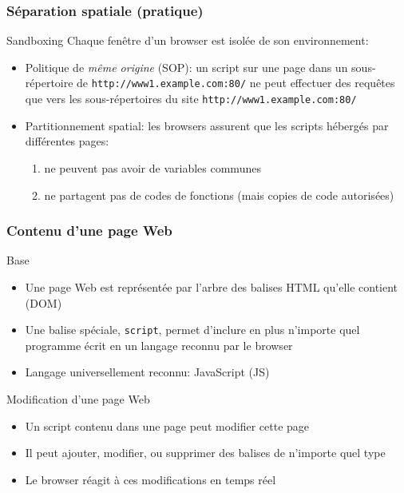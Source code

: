 \begin{reveals}
\begin{frame}
\end{frame}

\begin{frame}
    \frametitle{S{\'e}paration spatiale (pratique)}

  \begin{block}{Sandboxing}
    Chaque fen{\^e}tre d'un browser est isol{\'e}e de son environnement:
    \begin{itemize}
    \item Politique de \emph{m{\^e}me origine} (SOP): un script sur
      une page dans un sous-r\'epertoire de
      \texttt{http://www1.example.com:80/} ne peut effectuer des
      requ{\^e}tes que vers les sous-r\'epertoires du site
      \texttt{http://www1.example.com:80/}
    \item Partitionnement spatial: les browsers assurent que les
      scripts h{\'e}berg{\'e}s par diff{\'e}rentes pages:
      \begin{enumerate}
      \item ne peuvent pas avoir de variables communes
      \item ne partagent pas de codes de fonctions (mais copies de
        code autoris{\'e}es)
      \end{enumerate}
    \end{itemize}
  \end{block}
\end{frame}



\begin{frame}
  \frametitle{Contenu d'une page Web}

  \begin{block}{Base}
    \begin{itemize}
    \item Une page Web est repr{\'e}sent{\'e}e par l'arbre des balises HTML
      qu'elle contient (DOM)
    \item Une balise sp{\'e}ciale, \texttt{script}, permet d'inclure en
      plus n'importe quel programme {\'e}crit en un langage reconnu par le
      browser
    \item Langage universellement reconnu: JavaScript (JS)
    \end{itemize}
  \end{block}

  \pause

  \begin{block}{Modification d'une page Web}
    \begin{itemize}
    \item Un script contenu dans une page peut modifier cette page
    \item Il peut ajouter, modifier, ou supprimer des balises de
      n'importe quel type
    \item Le browser r{\'e}agit {\`a} ces modifications en temps r{\'e}el
    \end{itemize}
  \end{block}
\end{frame}



\end{reveals}
